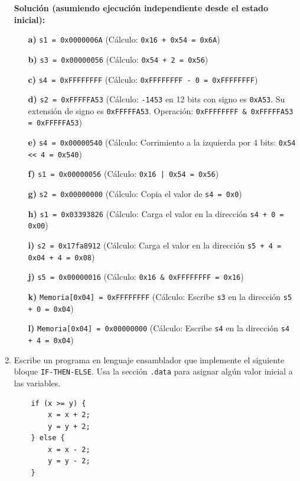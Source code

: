 \documentclass[letterpaper,12pt]{article}
\begin{document}
\begin{enumerate}
    \vspace{0.3cm}
    \color{solcolor}
    \textbf{Solución (asumiendo ejecución independiente desde el estado inicial):}
    \begin{itemize}[noitemsep]
        \item[\textbf{a)}] \texttt{s1 = 0x0000006A} (Cálculo: \texttt{0x16 + 0x54 = 0x6A})
        \item[\textbf{b)}] \texttt{s3 = 0x00000056} (Cálculo: \texttt{0x54 + 2 = 0x56})
        \item[\textbf{c)}] \texttt{s4 = 0xFFFFFFFF} (Cálculo: \texttt{0xFFFFFFFF - 0 = 0xFFFFFFFF})
        \item[\textbf{d)}] \texttt{s2 = 0xFFFFFA53} (Cálculo: \texttt{-1453} en 12 bits con signo es \texttt{0xA53}. Su extensión de signo es \texttt{0xFFFFFA53}. Operación: \texttt{0xFFFFFFFF \& 0xFFFFFA53 = 0xFFFFFA53})
        \item[\textbf{e)}] \texttt{s4 = 0x00000540} (Cálculo: Corrimiento a la izquierda por 4 bits: \texttt{0x54 \textless\textless\ 4 = 0x540})
        \item[\textbf{f)}] \texttt{s1 = 0x00000056} (Cálculo: \texttt{0x16 | 0x54 = 0x56})
        \item[\textbf{g)}] \texttt{s2 = 0x00000000} (Cálculo: Copia el valor de \texttt{s4 = 0x0})
        \item[\textbf{h)}] \texttt{s1 = 0x03393826} (Cálculo: Carga el valor en la dirección \texttt{s4 + 0 = 0x00})
        \item[\textbf{i)}] \texttt{s2 = 0x17fa8912} (Cálculo: Carga el valor en la dirección \texttt{s5 + 4 = 0x04 + 4 = 0x08})
        \item[\textbf{j)}] \texttt{s5 = 0x00000016} (Cálculo: \texttt{0x16 \& 0xFFFFFFFF = 0x16})
        \item[\textbf{k)}] \texttt{Memoria[0x04] = 0xFFFFFFFF} (Cálculo: Escribe \texttt{s3} en la dirección \texttt{s5 + 0 = 0x04})
        \item[\textbf{l)}] \texttt{Memoria[0x04] = 0x00000000} (Cálculo: Escribe \texttt{s4} en la dirección \texttt{s4 + 4 = 0x04})
    \end{itemize}
    \color{black}

    \vspace{0.5cm}

    \item Escribe un programa en lenguaje ensamblador que implemente el siguiente bloque \texttt{IF-THEN-ELSE}. Usa la sección \texttt{.data} para asignar algún valor inicial a las variables.
    \begin{verbatim}
    if (x >= y) {
        x = x + 2; 
        y = y + 2;
    } else {
        x = x - 2;
        y = y - 2;
    }
    \end{verbatim}


\end{enumerate}
\end{document}
